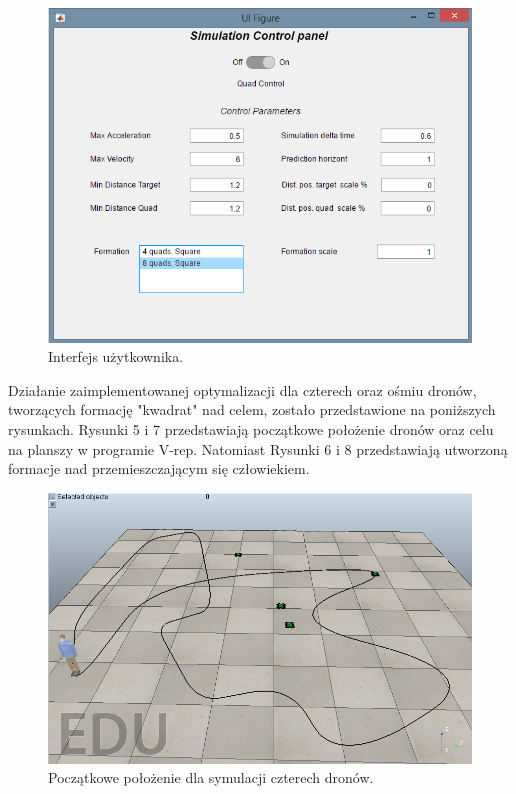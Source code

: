 \documentclass[a4paper, 11pt, oneside]{article}
\begin{document}
\begin{figure}[H]
\centering
\includegraphics[scale=0.5]{interfejs.png}
\caption{Interfejs użytkownika.}
\end{figure}
Działanie zaimplementowanej optymalizacji dla czterech oraz ośmiu dronów, tworzących formację "kwadrat" nad celem, zostało przedstawione na poniższych rysunkach. Rysunki 5 i 7 przedstawiają początkowe położenie dronów oraz celu na planszy w programie V-rep. Natomiast Rysunki 6 i 8 przedstawiają utworzoną formacje nad przemieszczającym się człowiekiem.

\begin{figure}[H]
\centering
\includegraphics[scale=0.5]{sim_4_1.png}
\caption{Początkowe położenie dla symulacji czterech dronów.}
\end{figure}
\end{document}
